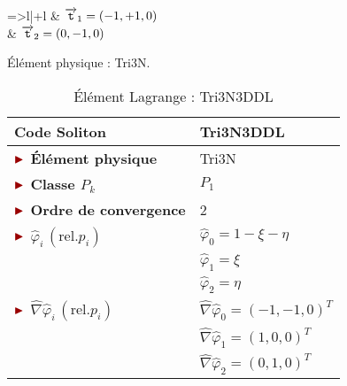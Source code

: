 \begin{table}[H]
\begin{minipage}[t]{0.48\linewidth}
\begin{tabular}{=>{\bfseries}l|+l}
			& $\overrightarrow{\boldsymbol{\mathtt{t}}}_1 =\left(-1, +1, 0\right)$\\
			& $\overrightarrow{\boldsymbol{\mathtt{t}}}_2 =\left(0, -1, 0\right)$\\
			\bottomrule %
		\end{tabular}
		\caption{Élément physique : Tri3N.}
		\label{tab:Tri3N}
	\end{minipage}\hfill
	\begin{minipage}[t]{0.48\linewidth}
		\centering
		\begin{tabular}{>{\bfseries} l|l}
			\toprule %
			\rowcolor{black!10}\rowstyle{\color{MyRed}\bfseries} Code Soliton & \textcolor{MyRed}{\textbf{Tri3N3DDL}}\\
			\midrule
			$\mytriangle$ Élément physique & \textcolor{MyRed}{Tri3N}\\
			$\mytriangle$ Classe $P_k$ & $P_1$\\
			$\mytriangle$ Ordre de convergence & 2\\
			\midrule
			$\mytriangle$ $\widehat{\varphi}_i\, (\text{rel.} p_i)$ &  $\widehat{\varphi}_0 = 1- \xi -\eta$\\
			&  $\widehat{\varphi}_1 = \xi$\\
			&  $\widehat{\varphi}_2 = \eta$\\
			\midrule
			$\mytriangle$ $\widehat{\nabla}\widehat{\varphi}_i\, (\text{rel.} p_i)$ & $\widehat{\nabla}\widehat{\varphi}_0 = \left(-1, -1, 0\right)^T$ \\
			& $\widehat{\nabla}\widehat{\varphi}_1 = \left(1, 0, 0\right)^T$ \\
			& $\widehat{\nabla}\widehat{\varphi}_2 = \left(0, 1, 0\right)^T$ \\
			\bottomrule %
		\end{tabular}
		\caption{Élément Lagrange : Tri3N3DDL}
		\label{tab:Tri3N3DDL}
	\end{minipage}\hfill
\end{table}

